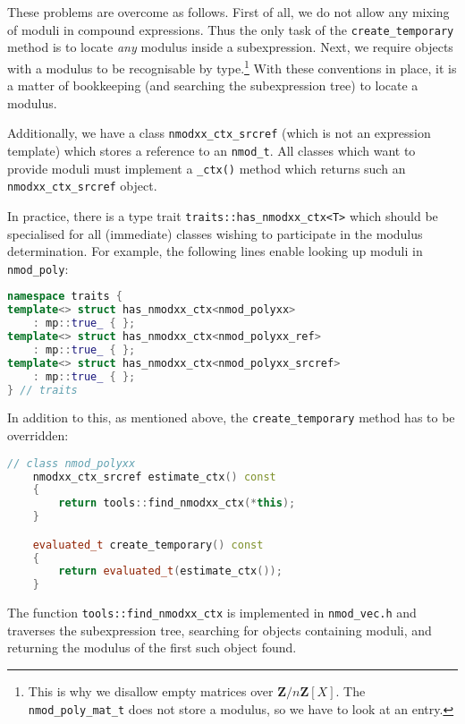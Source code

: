 \documentclass[a4paper,10pt]{book}
\newcommand{\code}{\lstinline}
\begin{document}
{{These problems are overcome as follows. First of all, we do not allow any mixing
of moduli in compound expressions. Thus the only task of the
\code{create_temporary} method is to locate \emph{any} modulus inside a
subexpression. Next, we require objects with a modulus to be recognisable by
type.\footnote{This is why we disallow empty matrices over
$\mathbf{Z}/n\mathbf{Z}[X]$. The \code{nmod_poly_mat_t} does not store a
modulus, so we have to look at an entry.} With these conventions in place, it is
a matter of bookkeeping (and searching the subexpression tree) to locate a
modulus.

Additionally, we have a class \code{nmodxx_ctx_srcref} (which is not an
expression template) which stores a reference to an \code{nmod_t}. All classes
which want to provide moduli must implement a \code{_ctx()} method which returns
such an \code{nmodxx_ctx_srcref} object.

In practice, there is a type trait \code{traits::has_nmodxx_ctx<T>} which should
be specialised for all (immediate) classes wishing to participate in the modulus
determination. For example, the following lines enable looking up moduli in
\code{nmod_poly}:

\begin{lstlisting}[language=c++]
namespace traits {
template<> struct has_nmodxx_ctx<nmod_polyxx>
    : mp::true_ { };
template<> struct has_nmodxx_ctx<nmod_polyxx_ref>
    : mp::true_ { };
template<> struct has_nmodxx_ctx<nmod_polyxx_srcref>
    : mp::true_ { };
} // traits
\end{lstlisting}

In addition to this, as mentioned above, the \code{create_temporary} method has
to be overridden:

\begin{lstlisting}[language=c++]
// class nmod_polyxx
    nmodxx_ctx_srcref estimate_ctx() const
    {
        return tools::find_nmodxx_ctx(*this);
    }

    evaluated_t create_temporary() const
    {
        return evaluated_t(estimate_ctx());
    }
\end{lstlisting}

The function \code{tools::find_nmodxx_ctx} is implemented in \code{nmod_vec.h}
and traverses the subexpression tree, searching for objects containing moduli,
and returning the modulus of the first such object found.


}}
\end{document}
